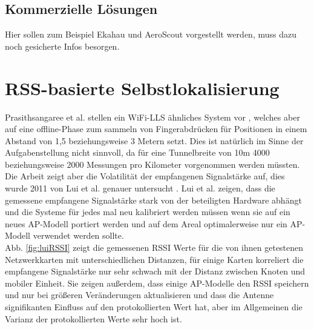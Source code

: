\subsection{Kommerzielle Lösungen}
Hier sollen zum Beispiel Ekahau und AeroScout vorgestellt werden, muss dazu noch gesicherte Infos besorgen.

\section{RSS-basierte Selbstlokalisierung}
\label{ch:Vorherige:sec:RSS-basierte}
Prasithsangaree et al. stellen ein WiFi-LLS ähnliches System vor \cite{prasithsangaree2002indoor}, welches aber auf eine offline-Phase zum sammeln von Fingerabdrücken für Positionen in einem Abstand von 1,5 beziehungsweise 3 Metern setzt. 
Dies ist natürlich im Sinne der Aufgabenstellung nicht sinnvoll, da für eine Tunnelbreite von 10m 4000 beziehungsweise 2000 Messungen pro Kilometer vorgenommen werden müssten.\\
Die Arbeit zeigt aber die Volatilität der empfangenen Signalstärke auf, dies wurde 2011 von Lui et al. genauer untersucht \cite{lui2011differences}.
Lui et al. zeigen, dass die gemessene empfangene Signalstärke stark von der beteiligten Hardware abhängt und die Systeme für jedes mal neu kalibriert werden müssen wenn sie auf ein neues AP-Modell portiert werden und auf dem Areal optimalerweise nur ein AP-Modell verwendet werden sollte. \\
Abb. \ref{fig:luiRSSI} zeigt die gemessenen RSSI Werte für die von ihnen getestenen Netzwerkkarten mit unterschiedlichen Distanzen, für einige Karten korreliert die empfangene Signalstärke nur sehr schwach mit der Distanz zwischen Knoten und mobiler Einheit.
Sie zeigen außerdem, dass einige AP-Modelle den RSSI speichern und nur bei größeren Veränderungen aktualisieren und dass die Antenne signifikanten Einfluss auf den protokollierten Wert hat, aber im Allgemeinen die Varianz der protokollierten Werte sehr hoch ist.



